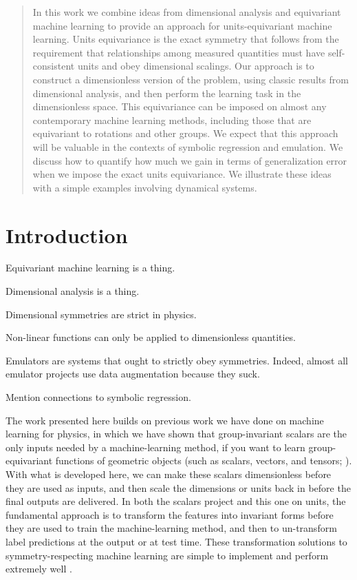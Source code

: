 \documentclass[nohyperref]{article}
\theoremstyle{plain}
\theoremstyle{definition}
\theoremstyle{remark}
\begin{document}
\printAffiliationsAndNotice{\icmlEqualContribution} %

\setlength{\footskip}{6ex}\thispagestyle{plain}\pagestyle{plain}

\begin{abstract}
In this work we combine ideas from dimensional analysis and equivariant machine learning to provide an approach for units-equivariant machine learning. Units equivariance is the exact symmetry that follows from the requirement that relationships among measured quantities must have self-consistent units and obey dimensional scalings. Our approach is to construct a dimensionless version of the problem, using classic results from dimensional analysis, and then perform the learning task in the dimensionless space. This equivariance can be imposed on almost any contemporary machine learning methods, including those that are equivariant to rotations and other groups. We expect that this approach will be valuable in the contexts of symbolic regression and emulation. We discuss how to quantify how much we gain in terms of generalization error when we impose the exact units equivariance. We illustrate these ideas with a simple examples involving dynamical systems.
\end{abstract}

\section{Introduction}

Equivariant machine learning is a thing. 

Dimensional analysis is a thing.

Dimensional symmetries are strict in physics.

Non-linear functions can only be applied to dimensionless quantities.

Emulators are systems that ought to strictly obey symmetries. Indeed, almost all emulator projects use data augmentation because they suck.

Mention connections to symbolic regression.

The work presented here builds on previous work we have done on machine learning for physics, in which we have shown that group-invariant scalars are the only inputs needed by a machine-learning method, if you want to learn group-equivariant functions of geometric objects (such as scalars, vectors, and tensors; \citealt{villar, yao}).
With what is developed here, we can make these scalars dimensionless before they are used as inputs, and then scale the dimensions or units back in before the final outputs are delivered.
In both the scalars project and this one on units, the fundamental approach is to transform the features into invariant forms before they are used to train the machine-learning method, and then to un-transform label predictions at the output or at test time.
These transformation solutions to symmetry-respecting machine learning are simple to implement and perform extremely well \cite{yao}.
\end{document}
